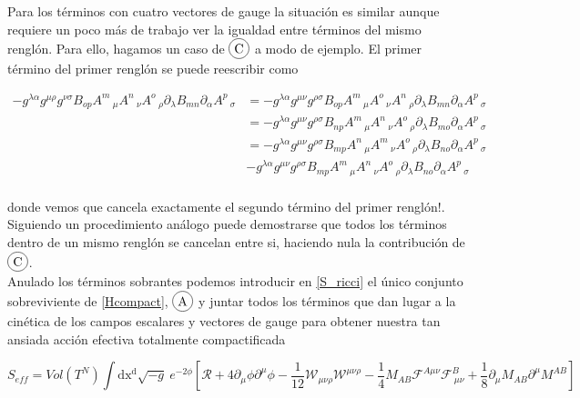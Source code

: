 \documentclass{article}
\numberwithin{equation}{section}
\newcommand*\circled[1]{\tikz[baseline=(char.base)]{ \node[shape=circle,draw,inner sep=2pt] (char) {#1};}} %
\begin{document}
Para los términos con cuatro vectores de gauge la situación es similar aunque requiere un poco más de trabajo ver la igualdad entre términos del mismo renglón. Para ello, hagamos un caso de $ \circled{C} $ a modo de ejemplo. El primer término del primer renglón se puede reescribir como

\begin{equation}
\begin{aligned}
- g^{\lambda \alpha} g^{\mu \rho} g^{\nu \sigma} B_{o p} A^{m}\,_{\mu} A^{n}\,_{\nu} A^{o}\,_{\rho} \partial_{\lambda}{B_{m n}} \partial_{\alpha}{A^{p}\,_{\sigma}} &= - g^{\lambda \alpha} g^{\mu \nu} g^{\rho \sigma} B_{o p} A^{m}\,_{\mu} A^{o}\,_{\nu} A^{n}\,_{\rho} \partial_{\lambda}{B_{m n}} \partial_{\alpha}{A^{p}\,_{\sigma}}\\
&= - g^{\lambda \alpha} g^{\mu \nu} g^{\rho \sigma} B_{n p} A^{m}\,_{\mu} A^{n}\,_{\nu} A^{o}\,_{\rho} \partial_{\lambda}{B_{m o}} \partial_{\alpha}{A^{p}\,_{\sigma}}\\
&= - g^{\lambda \alpha} g^{\mu \nu} g^{\rho \sigma} B_{m p} A^{n}\,_{\mu} A^{m}\,_{\nu} A^{o}\,_{\rho} \partial_{\lambda}{B_{n o}} \partial_{\alpha}{A^{p}\,_{\sigma}}\\
&- g^{\lambda \alpha} g^{\mu \nu} g^{\rho \sigma} B_{m p} A^{m}\,_{\mu} A^{n}\,_{\nu} A^{o}\,_{\rho} \partial_{\lambda}{B_{n o}} \partial_{\alpha}{A^{p}\,_{\sigma}}\\
\end{aligned}
\end{equation}

donde vemos que cancela exactamente el segundo término del primer renglón!. Siguiendo un procedimiento análogo puede demostrarse que todos los términos dentro de un mismo renglón se cancelan entre si, haciendo nula la contribución de $ \circled{C} $.\\

Anulado los términos sobrantes podemos introducir en \ref{S_ricci} el único conjunto sobreviviente de \ref{Hcompact}, $ \circled{A} $ y juntar todos los términos que dan lugar a la cinética de los campos escalares y vectores de gauge para obtener nuestra tan ansiada acción efectiva totalmente compactificada

\begin{boxquation}
	\begin{equation*}
	S_{eff}= Vol(T^N) \int\mathrm{dx^d} \sqrt{-g} \ e^{-2\phi}\left[ \mathcal{R} + 4 \partial_{\mu}\phi\partial^{\mu} \phi - \frac{1}{12} \mathcal{W}_{\mu \nu \rho} \mathcal{W}^{\mu \nu \rho} -\frac{1}{4} M_{A B} \mathcal{F}^{A \mu \nu} \mathcal{F}^B_{\ \mu \nu} + \frac{1}{8} \partial_{\mu} M_{A B} \partial^{\mu} M^{A B}\right] 
	\end{equation*}
\end{boxquation}
\end{document}
